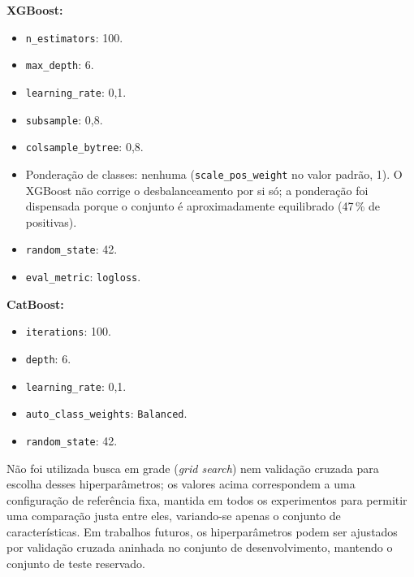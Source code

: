 \textbf{XGBoost:}
\begin{itemize}
	\item \texttt{n\_estimators}: 100.
	\item \texttt{max\_depth}: 6.
	\item \texttt{learning\_rate}: 0,1.
	\item \texttt{subsample}: 0,8.
	\item \texttt{colsample\_bytree}: 0,8.
	\item Ponderação de classes: nenhuma (\texttt{scale\_pos\_weight} no valor padrão, 1). O XGBoost não corrige o desbalanceamento por si só; a ponderação foi dispensada porque o conjunto é aproximadamente equilibrado (47\,\% de positivas).
	\item \texttt{random\_state}: 42.
	\item \texttt{eval\_metric}: \texttt{logloss}.
\end{itemize}

\textbf{CatBoost:}
\begin{itemize}
	\item \texttt{iterations}: 100.
	\item \texttt{depth}: 6.
	\item \texttt{learning\_rate}: 0,1.
	\item \texttt{auto\_class\_weights}: \texttt{Balanced}.
	\item \texttt{random\_state}: 42.
\end{itemize}

Não foi utilizada busca em grade (\textit{grid search}) nem validação cruzada para escolha desses hiperparâmetros; os valores acima correspondem a uma configuração de referência fixa, mantida em todos os experimentos para permitir uma comparação justa entre eles, variando-se apenas o conjunto de características. Em trabalhos futuros, os hiperparâmetros podem ser ajustados por validação cruzada aninhada no conjunto de desenvolvimento, mantendo o conjunto de teste reservado.
